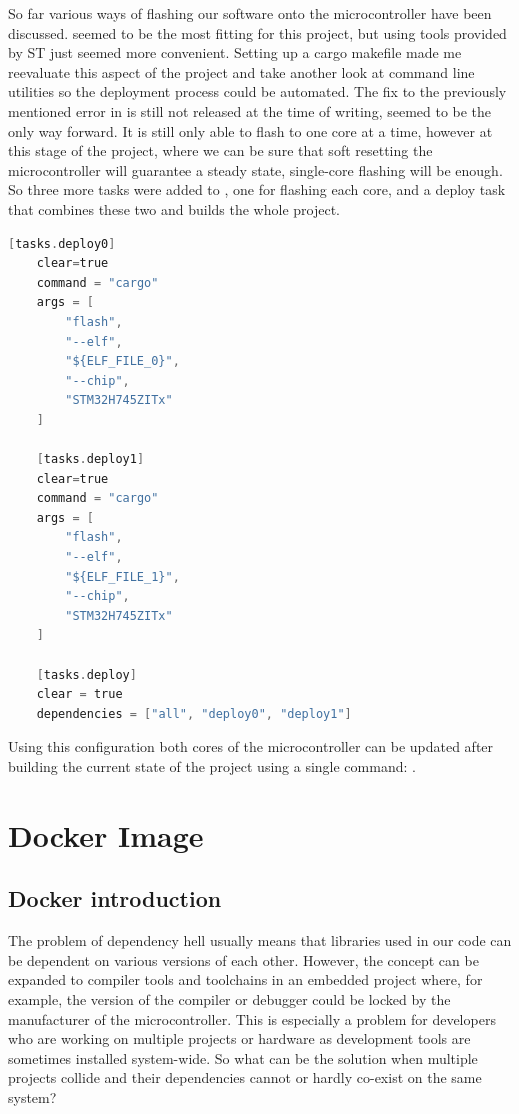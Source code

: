 So far various ways of flashing our software onto the microcontroller have been discussed.  seemed to be the most fitting for this project, but using tools provided by ST just seemed more convenient. Setting up a cargo makefile made me reevaluate this aspect of the project and take another look at command line utilities so the deployment process could be automated. The fix to the previously mentioned error in  is still not released at the time of writing,  seemed to be the only way forward. It is still only able to flash to one core at a time, however at this stage of the project, where we can be sure that soft resetting the microcontroller will guarantee a steady state, single-core flashing will be enough. So three more tasks were added to , one for flashing each core, and a deploy task that combines these two and builds the whole project.

\begin{lstlisting}[language=C,frame=single,float=!ht,label={lst:cargo-make-deploy},caption={Cargo Tasks to Flash the MCU}]
    [tasks.deploy0]
    clear=true
    command = "cargo"
    args = [
        "flash",
        "--elf",
        "${ELF_FILE_0}",
        "--chip",
        "STM32H745ZITx"
    ]

    [tasks.deploy1]
    clear=true
    command = "cargo"
    args = [
        "flash",
        "--elf",
        "${ELF_FILE_1}",
        "--chip",
        "STM32H745ZITx"
    ]

    [tasks.deploy]
    clear = true
    dependencies = ["all", "deploy0", "deploy1"]
\end{lstlisting}

Using this configuration both cores of the microcontroller can be updated after building the current state of the project using a single command: .

\section{Docker Image}

\subsection{Docker introduction}
The problem of dependency hell \cite{DependencyHell} usually means that libraries used in our code can be dependent on various versions of each other. However, the concept can be expanded to compiler tools and toolchains in an embedded project where, for example, the version of the compiler or debugger could be locked by the manufacturer of the microcontroller. This is especially a problem for developers who are working on multiple projects or hardware as development tools are sometimes installed system-wide. So what can be the solution when multiple projects collide and their dependencies cannot or hardly co-exist on the same system?

